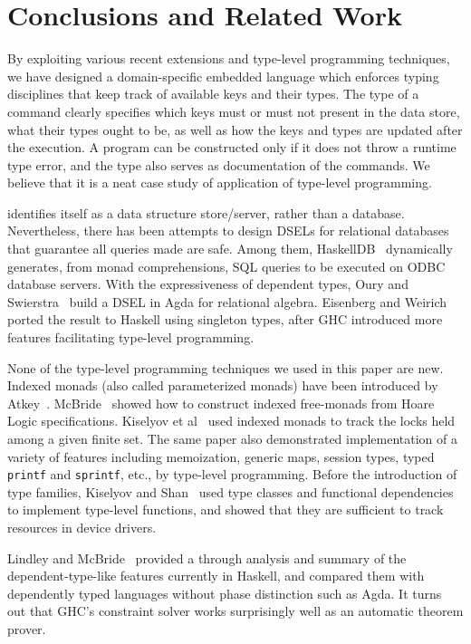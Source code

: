 
\section{Conclusions and Related Work}
\label{sec:conclusions}

By exploiting various recent extensions and type-level programming techniques,
we have designed a domain-specific embedded language \Edis{} which enforces
typing disciplines that keep track of available keys and their types. The
type of a command clearly specifies which keys must or must not present in
the data store, what their types ought to be, as well as how the keys and types are updated after the execution. A program can be constructed only if it does
not throw a runtime type error, and the type also serves as documentation of the
commands. We believe that it is a neat case study of application of type-level programming.

\Redis{} identifies itself as a data structure store/server, rather than a
database. Nevertheless, there has been attempts to design DSELs for relational
databases that guarantee all queries made are safe. Among them, {\sc HaskellDB}~\cite{haskelldb,haskelldbimproved} dynamically generates, from monad comprehensions, SQL queries to be executed on ODBC database servers.
With the expressiveness of dependent types, Oury and Swierstra~\cite{pi}
build a DSEL in Agda for relational algebra. Eisenberg and
Weirich~\cite{singletons} ported the result to Haskell using singleton types, after GHC introduced more features facilitating type-level programming.

None of the type-level programming techniques we used in this paper are new.
Indexed monads (also called parameterized monads) have been introduced by
Atkey~\cite{indexedmonad}. McBride~\cite{kleisli} showed how to construct
indexed free-monads from Hoare Logic specifications. Kiselyov et
al~\cite{typefun} used indexed monads to track the locks held among a given
finite set. The same paper also demonstrated implementation of a variety of
features including memoization, generic maps, session types, typed
\texttt{printf} and \texttt{sprintf}, etc., by type-level programming.
Before the introduction of type families, Kiselyov and
Shan~\cite{staticresources} used type classes and functional dependencies to
implement type-level functions, and showed that they are sufficient to track
resources in device drivers.

Lindley and McBride~\cite{phasedistinction} provided a through analysis and summary of the dependent-type-like features currently in Haskell, and
compared them with dependently typed languages without phase distinction such as Agda. It turns out that GHC's constraint solver works surprisingly well as an
automatic theorem prover.
